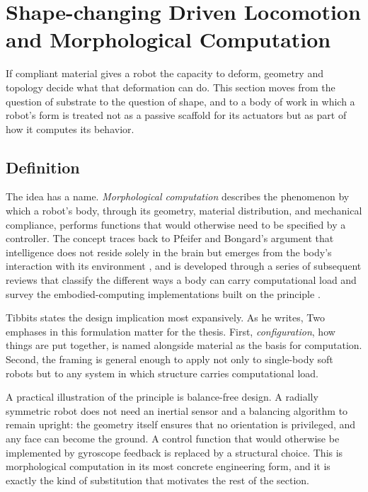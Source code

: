 \section{Shape-changing Driven Locomotion and Morphological Computation}
\label{sec:shape-changing}

If compliant material gives a robot the capacity to deform, geometry and topology decide what that deformation can do. This section moves from the question of substrate to the question of shape, and to a body of work in which a robot's form is treated not as a passive scaffold for its actuators but as part of how it computes its behavior.

\subsection{Definition}
\label{subsec:mc-definition}

The idea has a name. \textit{Morphological computation} describes the phenomenon by which a robot's body, through its geometry, material distribution, and mechanical compliance, performs functions that would otherwise need to be specified by a controller. The concept traces back to Pfeifer and Bongard's argument that intelligence does not reside solely in the brain but emerges from the body's interaction with its environment \cite{pfeiferHowBodyShapes2007}, and is developed through a series of subsequent reviews that classify the different ways a body can carry computational load and survey the embodied-computing implementations built on the principle \cite{paul_morphological_2006, mullerWhatMorphologicalComputation2017, hauserMorphologicalComputationPresent2024}.

Tibbits states the design implication most expansively. As he writes, \cite{tibbitsThingsFallTogether2021} Two emphases in this formulation matter for the thesis. First, \textit{configuration}, how things are put together, is named alongside material as the basis for computation. Second, the framing is general enough to apply not only to single-body soft robots but to any system in which structure carries computational load.

A practical illustration of the principle is balance-free design. A radially symmetric robot does not need an inertial sensor and a balancing algorithm to remain upright: the geometry itself ensures that no orientation is privileged, and any face can become the ground. A control function that would otherwise be implemented by gyroscope feedback is replaced by a structural choice. This is morphological computation in its most concrete engineering form, and it is exactly the kind of substitution that motivates the rest of the section.

